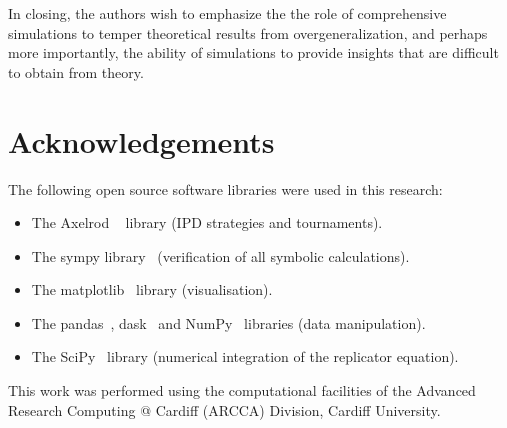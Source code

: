 \documentclass[a4paper]{article}
\begin{document}
In closing, the authors wish to emphasize the the role of comprehensive simulations to temper
theoretical results from overgeneralization, and perhaps more importantly, the
ability of simulations to provide insights that are difficult to obtain from theory.

\section*{Acknowledgements}

The following open source software libraries were used in this research:

\begin{itemize}
    \item The Axelrod ~\cite{Knight2016, Knight2018} library (IPD strategies and
        tournaments).
    \item The sympy library~\cite{Meurer2017} (verification of all symbolic
        calculations).
    \item The matplotlib~\cite{Droettboom2018} library (visualisation).
    \item The pandas~\cite{Structures2010}, dask~\cite{Dask2016} and
        NumPy~\cite{Oliphant2015} libraries (data manipulation).
    \item The SciPy~\cite{Jones2001} library (numerical integration of the
        replicator equation).
\end{itemize}

This work was performed using the computational facilities of the Advanced
Research Computing @ Cardiff (ARCCA) Division, Cardiff University.

\printbibliography




\end{document}
